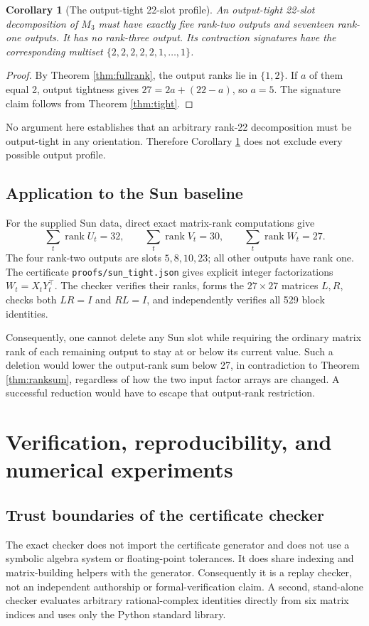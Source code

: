 \documentclass[11pt,letterpaper]{article}
\newtheorem{corollary}[theorem]{Corollary}
\theoremstyle{definition}\newtheorem{definition}[theorem]{Definition}
\theoremstyle{remark}\newtheorem{remark}[theorem]{Remark}
\DeclareMathOperator{\rank}{rank}\DeclareMathOperator{\tr}{tr}
\newcommand{\file}[1]{\nolinkurl{#1}}
\begin{document}
\begin{corollary}[The output-tight 22-slot profile]\label{cor:22}
An output-tight 22-slot decomposition of $M_3$ must have exactly five
rank-two outputs and seventeen rank-one outputs. It has no rank-three
output. Its contraction signatures have the corresponding multiset
$\{2,2,2,2,2,1,\ldots,1\}$.
\end{corollary}
\begin{proof}
By Theorem \ref{thm:fullrank}, the output ranks lie in $\{1,2\}$. If $a$
of them equal 2, output tightness gives $27=2a+(22-a)$, so $a=5$.
The signature claim follows from Theorem \ref{thm:tight}.
\end{proof}

No argument here establishes that an arbitrary rank-22 decomposition must
be output-tight in any orientation. Therefore Corollary \ref{cor:22}
does not exclude every possible output profile.

\subsection{Application to the Sun baseline}
For the supplied Sun data, direct exact matrix-rank computations give
\[
 \sum_t\rank U_t=32,\qquad
 \sum_t\rank V_t=30,\qquad
 \sum_t\rank W_t=27.
\]
The four rank-two outputs are slots $5,8,10,23$; all other outputs have
rank one. The certificate \file{proofs/sun_tight.json} gives explicit
integer factorizations $W_t=X_tY_t^\top$. The checker verifies their
ranks, forms the $27\times27$ matrices $L,R$, checks both $LR=I$ and
$RL=I$, and independently verifies all 529 block identities.

Consequently, one cannot delete any Sun slot while requiring the ordinary
matrix rank of each remaining output to stay at or below its current
value. Such a deletion would lower the output-rank sum below 27, in
contradiction to Theorem \ref{thm:ranksum}, regardless of how the two input
factor arrays are changed. A successful reduction would have to escape
that output-rank restriction.

\section{Verification, reproducibility, and numerical experiments}
\label{sec:verification}
\subsection{Trust boundaries of the certificate checker}
The exact checker does not import the certificate generator and does not
use a symbolic algebra system or floating-point tolerances. It does share
indexing and matrix-building helpers with the generator. Consequently it
is a replay checker, not an independent authorship or formal-verification
claim. A second, stand-alone checker evaluates arbitrary rational-complex
identities directly from six matrix indices and uses only the Python
standard library.
\end{document}
